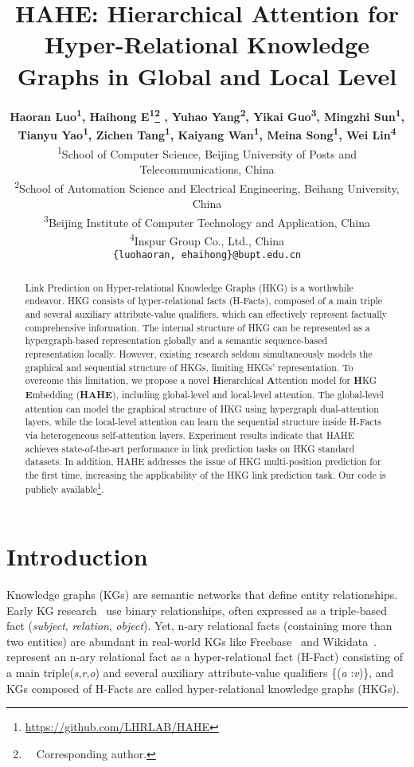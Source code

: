 \documentclass[11pt]{article}
\title{HAHE: Hierarchical Attention for Hyper-Relational Knowledge Graphs in Global and Local Level}
\author{ {\bf Haoran Luo\textsuperscript{\rm 1}, Haihong E\textsuperscript{\rm 1}\thanks{\ \ Corresponding author.}  , Yuhao Yang\textsuperscript{\rm 2}, Yikai Guo\textsuperscript{\rm 3}, Mingzhi Sun\textsuperscript{\rm 1},} \\{\bf Tianyu Yao\textsuperscript{\rm 1}, Zichen Tang\textsuperscript{\rm 1}, Kaiyang Wan\textsuperscript{\rm 1}, Meina Song\textsuperscript{\rm 1}, Wei Lin\textsuperscript{\rm 4}} \\
         \textsuperscript{1}School of Computer Science, Beijing University of Posts and Telecommunications, China \\ 
         \textsuperscript{2}School of Automation Science and Electrical Engineering, Beihang University, China \\ 
         \textsuperscript{3}Beijing Institute of Computer Technology and Application, China \\ 
         \textsuperscript{4}Inspur Group Co., Ltd., China \\ 
         \texttt{\{luohaoran, ehaihong\}@bupt.edu.cn}}
\begin{document}
\maketitle
\begin{abstract}
 Link Prediction on Hyper-relational Knowledge Graphs (HKG) is a worthwhile endeavor. HKG consists of hyper-relational facts (H-Facts), composed of a main triple and several auxiliary attribute-value qualifiers, which can effectively represent factually comprehensive information. The internal structure of HKG can be represented as a hypergraph-based representation globally and a semantic sequence-based representation locally. However, existing research seldom simultaneously models the graphical and sequential structure of HKGs, limiting HKGs' representation. To overcome this limitation, we propose a novel \textbf{H}ierarchical \textbf{A}ttention model for \textbf{H}KG \textbf{E}mbedding (\textbf{HAHE}), including global-level and local-level attention. The global-level attention can model the graphical structure of HKG using hypergraph dual-attention layers, while the local-level attention can learn the sequential structure inside H-Facts via heterogeneous self-attention layers. Experiment results indicate that HAHE achieves state-of-the-art performance in link prediction tasks on HKG standard datasets. In addition, HAHE addresses the issue of HKG multi-position prediction for the first time, increasing the applicability of the HKG link prediction task. Our code is publicly available\footnote{\url{https://github.com/LHRLAB/HAHE}}.
\end{abstract}

\section{Introduction}

Knowledge graphs (KGs) are semantic networks that define entity relationships. Early KG research~\citep{TransE,RotatE,TuckER} use binary relationships, often expressed as a triple-based fact (\textit{subject}, \textit{relation}, \textit{object}). Yet, n-ary relational facts (containing more than two entities) are abundant in real-world KGs like Freebase~\citep{Freebase} and Wikidata~\citep{Wikidata}. \citet{HINGE} represent an n-ary relational fact as a hyper-relational fact (H-Fact) consisting of a main triple(\textit{s},\textit{r},\textit{o}) and several auxiliary attribute-value qualifiers \{(\textit{a }:\textit{v})\}, and KGs composed of H-Facts are called hyper-relational knowledge graphs (HKGs).
\end{document}
